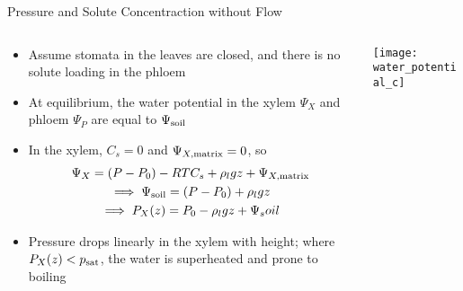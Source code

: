 \documentclass[10pt]{beamer}
\newcommand{\tn}{\textnormal}
\begin{document}
\begin{frame}{Pressure and Solute Concentraction without Flow}
  \begin{columns}
    \begin{column}{.69\textwidth}
      \begin{itemize}
      \item Assume stomata in the leaves are closed, and there is no
        solute loading in the phloem
      \item At equilibrium, the water potential in the xylem $\Psi_X$
        and phloem $\Psi_P$ are equal to $\Psi_\tn{soil}$
      \item In the xylem, $C_s = 0$ and $\Psi_{X, \tn{matrix}} = 0$,
        so
        \begin{multline*}
          \Psi_X = (P - P_0) - RTC_s + \rho_l g z + \Psi_{X,
            \tn{matrix}} \\
          \implies \Psi_\tn{soil} = (P - P_0) + \rho_l g z \\
          \implies P_X(z) = P_0 - \rho_l g z + \Psi_soil
        \end{multline*}
      \item Pressure drops linearly in the xylem with height; where
        $P_X(z) < p_\tn{sat}$, the water is superheated and prone to
        boiling
      \end{itemize}
    \end{column}
    \begin{column}{.29\textwidth}
      \vfill
      \texttt{[image: water\_potential\_c]}
      \vfill
    \end{column}
  \end{columns}
\end{frame}
\end{document}
